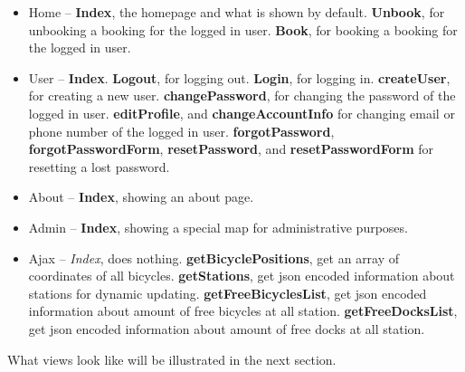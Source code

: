\begin{itemize}
\item Home -- \textbf{Index}, the homepage and what is shown by default. \textbf{Unbook}, for unbooking a booking for the logged in user. \textbf{Book}, for booking a booking for the logged in user. 
\item User -- \textbf{Index}. \textbf{Logout}, for logging out. \textbf{Login}, for logging in. \textbf{createUser}, for creating a new user. \textbf{changePassword}, for changing the password of the logged in user. \textbf{editProfile}, and \textbf{changeAccountInfo} for changing email or phone number of the logged in user. \textbf{forgotPassword}, \textbf{forgotPasswordForm}, \textbf{resetPassword}, and \textbf{resetPasswordForm} for resetting a lost password.
\item About -- \textbf{Index}, showing an about page.
\item Admin -- \textbf{Index}, showing a special map for administrative purposes.
\item Ajax -- \textit{Index}, does nothing. \textbf{getBicyclePositions}, get an array of coordinates of all bicycles. \textbf{getStations}, get json encoded information about stations for dynamic updating. \textbf{getFreeBicyclesList}, get json encoded information about amount of free bicycles at all station. \textbf{getFreeDocksList}, get json encoded information about amount of free docks at all station.
\end{itemize}

What views look like will be illustrated in the next section.